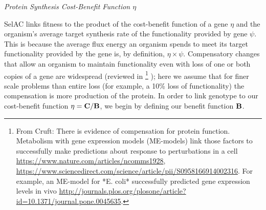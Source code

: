 \documentclass[12pt,letterpaper,fleqn]{article}
\renewcommand{\subsection}[1]{%
\bigskip
\begin{center}
\begin{large}
\normalfont\itshape #1
\end{large}
\end{center}}
\newcommand{\Cost}{\ensuremath{\text{\textbf{C}}}\xspace}
\newcommand{\Func}{\ensuremath{\text{\textbf{B}}}\xspace}
\newcommand{\selac}{SelAC\xspace}
\begin{document}
\subsection{Protein Synthesis Cost-Benefit Function $\eta$}
\selac links fitness to the product of the cost-benefit function of a gene $\eta$ and the organism's average target synthesis rate of the functionality provided by gene $\psi$.
This is because the average flux energy an organism spends to meet its target functionality provided by the gene is, by definition, $\eta \times \psi$.
Compensatory changes that allow an organism to maintain functionality even with loss of one or both copies of a gene are widespread (reviewed in \citet{PLACEHOLDER}
\footnote{From Cruft: 
There is evidence of compensation for protein function. Metabolism with gene expression models (ME-models) link those factors to successfully make predictions about response to perturbations in a cell \url{https://www.nature.com/articles/ncomms1928}, \url{https://www.sciencedirect.com/science/article/pii/S0958166914002316}. For example, an ME-model for *E. coli* successfully predicted gene expression levels in vivo \url{http://journals.plos.org/plosone/article?id=10.1371/journal.pone.0045635}.
}
); here we assume that for finer scale problems than entire loss (for example, a 10\% loss of functionality) the compensation is more production of the protein.
In order to link genotype to our cost-benefit function $\eta = \Cost/\Func$, we begin by defining our benefit function \Func.

\end{document}
